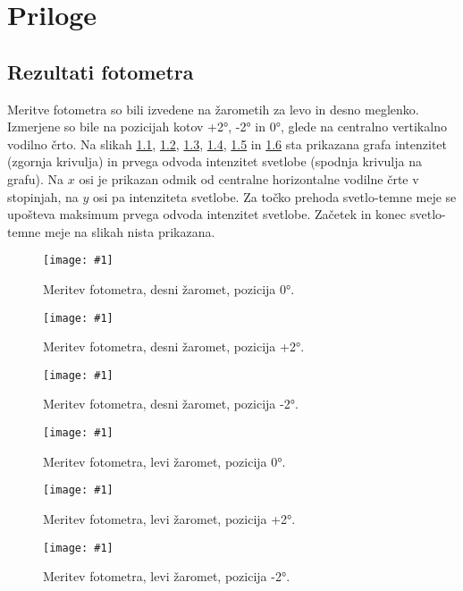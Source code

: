 \documentclass[oneside, a4paper, 12pt]{book}
\newcommand{\slika}[3]{
	\begin{figure}
	\begin{center}
	\texttt{[image: \#1]}
	\end{center}
	\vspace{-20pt}
	\caption{#2}
	\label{#3}
	\end{figure}
}
\begin{document}
\chapter{Priloge}
\section{Rezultati fotometra}
\label{ch:rf}
Meritve fotometra so bili izvedene na žarometih za levo in desno meglenko. Izmerjene so bile na pozicijah kotov +2°, -2° in 0°, glede na centralno vertikalno vodilno črto. Na slikah \ref{pic:foto-1}, \ref{pic:foto-2}, \ref{pic:foto-3}, \ref{pic:foto-4}, \ref{pic:foto-5} in \ref{pic:foto-6} sta prikazana grafa intenzitet (zgornja krivulja) in prvega odvoda intenzitet svetlobe (spodnja krivulja na grafu). Na $x$ osi je prikazan odmik od centralne horizontalne vodilne črte v stopinjah, na $y$ osi pa intenziteta svetlobe. Za točko prehoda svetlo-temne meje se upošteva maksimum prvega odvoda intenzitet svetlobe. Začetek in konec svetlo-temne meje na slikah nista prikazana.

\slika{slike/fotometer-desni-0.jpg}{Meritev fotometra, desni žaromet, pozicija 0°.}{pic:foto-1}

\slika{slike/fotometer-desni-+2.jpg}{Meritev fotometra, desni žaromet, pozicija +2°.}{pic:foto-2}

\slika{slike/fotometer-desni--2.jpg}{Meritev fotometra, desni žaromet, pozicija -2°.}{pic:foto-3}

\slika{slike/fotometer-levi-0.jpg}{Meritev fotometra, levi žaromet, pozicija 0°.}{pic:foto-4}

\slika{slike/fotometer-levi-+2.jpg}{Meritev fotometra, levi žaromet, pozicija +2°.}{pic:foto-5}

\slika{slike/fotometer-levi--2.jpg}{Meritev fotometra, levi žaromet, pozicija -2°.}{pic:foto-6}
\end{document}
